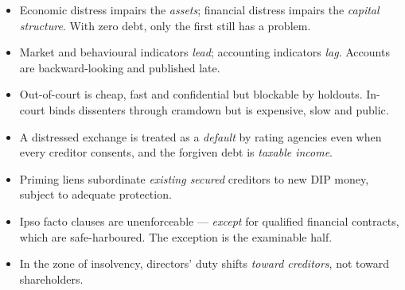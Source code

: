 \begin{imtrapbox}[title={Consolidated trap summary --- IM-13}]
\begin{itemize}
\item {} Economic distress impairs the \emph{assets};
financial distress impairs the \emph{capital structure}. With zero debt, only the
first still has a problem.
\item {} Market and behavioural indicators \emph{lead};
accounting indicators \emph{lag}. Accounts are backward-looking and published late.
\item {} Out-of-court is cheap, fast and confidential but
blockable by holdouts. In-court binds dissenters through cramdown but is expensive,
slow and public.
\item {} A distressed exchange is treated as a \emph{default} by
rating agencies even when every creditor consents, and the forgiven debt is
\emph{taxable income}.
\item {} Priming liens subordinate \emph{existing secured}
creditors to new DIP money, subject to adequate protection.
\item {} Ipso facto clauses are unenforceable ---
\emph{except} for qualified financial contracts, which are safe-harboured. The
exception is the examinable half.
\item {} In the zone of insolvency, directors' duty shifts
\emph{toward creditors}, not toward shareholders.
\end{itemize}
\end{imtrapbox}

